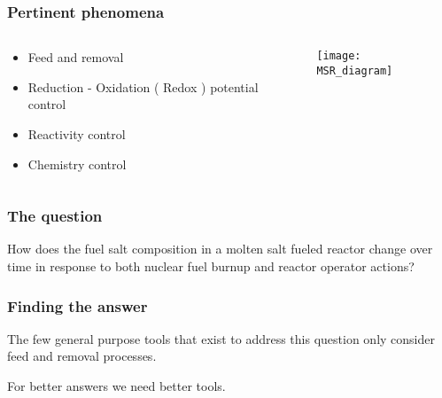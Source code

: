 \documentclass{beamer}
\begin{document}
\begin{frame}
\frametitle{Pertinent phenomena}

    \begin{columns}

        \begin{column}{0.5\textwidth}

            \begin{itemize}
                \item Feed and removal 
                \item Reduction - Oxidation ( Redox ) potential control
                \item Reactivity control 
                \item Chemistry control
            \end{itemize}

        \end{column}

        \begin{column}{0.5\textwidth}

            \begin{figure}
                \centering
                \texttt{[image: MSR\_diagram]}
                \label{fig:msr_diagram}
            \end{figure}

        \end{column}

    \end{columns}

\end{frame}

\begin{frame}
\frametitle{The question}

How does the fuel salt composition in a molten salt fueled reactor change over
time in response to both nuclear fuel burnup and reactor operator actions?

\end{frame}

\begin{frame}
\frametitle{Finding the answer}

    The few general purpose tools that exist to address this question only
    consider feed and removal processes. 

\hspace{2cm}

For better answers we need better tools.

\end{frame}
\end{document}

